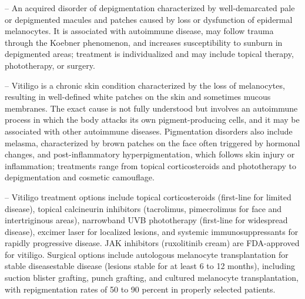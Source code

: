 -- An acquired disorder of depigmentation characterized by well-demarcated pale or depigmented macules and patches caused by loss or dysfunction of epidermal melanocytes. It is associated with autoimmune disease, may follow trauma through the Koebner phenomenon, and increases susceptibility to sunburn in depigmented areas; treatment is individualized and may include topical therapy, phototherapy, or surgery.

-- Vitiligo is a chronic skin condition characterized by the loss of melanocytes, resulting in well-defined white patches on the skin and sometimes mucous membranes. The exact cause is not fully understood but involves an autoimmune process in which the body attacks its own pigment-producing cells, and it may be associated with other autoimmune diseases. Pigmentation disorders also include melasma, characterized by brown patches on the face often triggered by hormonal changes, and post-inflammatory hyperpigmentation, which follows skin injury or inflammation; treatments range from topical corticosteroids and phototherapy to depigmentation and cosmetic camouflage.

-- Vitiligo treatment options include topical corticosteroids (first-line for limited disease), topical calcineurin inhibitors (tacrolimus, pimecrolimus for face and intertriginous areas), narrowband UVB phototherapy (first-line for widespread disease), excimer laser for localized lesions, and systemic immunosuppressants for rapidly progressive disease. JAK inhibitors (ruxolitinib cream) are FDA-approved for vitiligo. Surgical options include autologous melanocyte transplantation for stable diseasestable disease (lesions stable for at least 6 to 12 months), including suction blister grafting, punch grafting, and cultured melanocyte transplantation, with repigmentation rates of 50 to 90 percent in properly selected patients.

